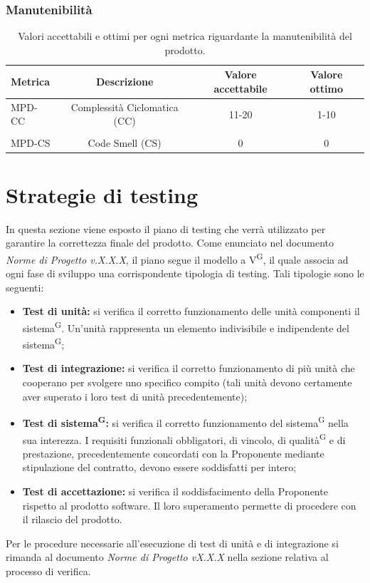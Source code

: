 \documentclass[8pt]{article}
\newcommand{\glossterm}[1]{#1\textsuperscript{G}} %
\begin{document}
\subsubsection{Manutenibilità}
\begin{table}[H]	
	\centering
	\begin{tabular}{lccc}
		\toprule
		\textbf{Metrica}& \textbf{Descrizione} & \textbf{Valore accettabile} & \textbf{Valore ottimo} \\
		\midrule
		MPD-CC & Complessità Ciclomatica (CC) & 11-20 & 1-10 \\\\
		MPD-CS & Code Smell (CS) & 0 & 0 \\
		\bottomrule
	\end{tabular}
	\caption{Valori accettabili e ottimi per ogni metrica riguardante la manutenibilità del prodotto.}
	\label{table:Valori accettabili e ottimi per ogni metrica riguardante la manutenibilità del prodotto.}
\end{table}
\clearpage
\section{Strategie di testing}
In questa sezione viene esposto il piano di testing che verrà utilizzato per garantire la correttezza finale del prodotto. Come enunciato nel documento \textit{Norme di Progetto v.X.X.X}, il piano segue il modello a \glossterm{V}, il quale associa ad ogni fase di sviluppo una corrispondente tipologia di testing. Tali tipologie sono le seguenti:
\begin{itemize}
	\item \textbf{Test di unità:} si verifica il corretto funzionamento delle unità componenti il \glossterm{sistema}. Un’unità rappresenta un elemento indivisibile e indipendente del \glossterm{sistema}; 
	\item \textbf{Test di integrazione:} si verifica il corretto funzionamento di più unità che cooperano per svolgere uno specifico compito (tali unità devono certamente aver superato i loro test di unità precedentemente);
	\item \textbf{\glossterm{Test di sistema}:} si verifica il corretto funzionamento del \glossterm{sistema} nella sua interezza. I requisiti funzionali obbligatori, di vincolo, di \glossterm{qualità} e di prestazione, precedentemente concordati con la Proponente mediante stipulazione del contratto, devono essere soddisfatti per intero;
	\item \textbf{Test di accettazione:} si verifica il soddisfacimento della Proponente rispetto al prodotto software. Il loro superamento permette di procedere con il rilascio del prodotto.
\end{itemize}
Per le procedure necessarie all’esecuzione di test di unità e di integrazione si rimanda al documento \textit{Norme di Progetto vX.X.X} nella sezione relativa al processo di verifica.
\end{document}
